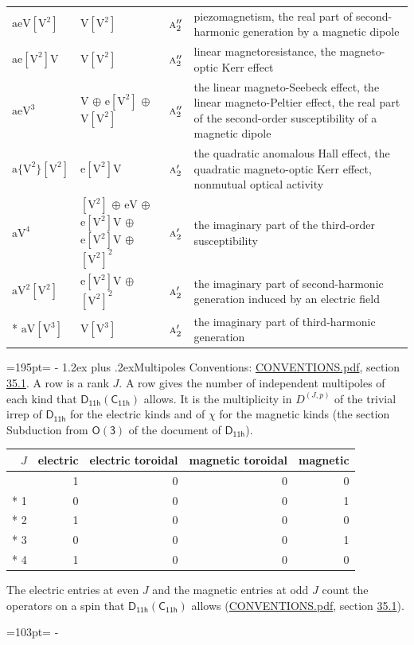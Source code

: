 \documentclass[10pt,a4paper]{article}
\makeatletter
\renewcommand\section{\@startsection{section}{1}{\z@}{-3ex plus -1ex minus -.2ex}%
  {1.2ex plus .2ex}{\normalfont\large\sffamily\bfseries\color{parttitle}}}
\newcommand{\needspace}[1]{\par\penalty-100\begingroup\dimen0=#1\relax\dimen2=\pagegoal
  \advance\dimen2-\pagetotal\ifdim\dimen0>\dimen2\relax\ifdim\dimen2>0pt\vfil\break\fi\fi
  \endgroup}
\numberwithin{equation}{section}
\newcommand{\grp}[1]{\mathsf{#1}}
\newcommand{\irr}[1]{\text{\normalfont\scshape #1}}
\newcommand{\irrJp}[2]{D^{(#1,#2)}}
\newcommand{\jahn}[1]{\mathrm{#1}}
\newlength{\fillwidth}\newlength{\cellwidth}\newlength{\colwidth}
\makeatother
\begin{document}
{\begin{longtable}{@{}lll>{\RaggedRight\arraybackslash}p{\fillwidth}@{}}
$\jahn{aeV[V^{2}]}$ & $\jahn{V[V^{2}]}$ & $\irr{a}_{2}''$ & piezomagnetism, the real part of second-harmonic generation by a magnetic dipole\\
$\jahn{ae[V^{2}]V}$ & $\jahn{V[V^{2}]}$ & $\irr{a}_{2}''$ & linear magnetoresistance, the magneto-optic Kerr effect\\
$\jahn{aeV^{3}}$ & $\jahn{V}$ $\oplus$ $\jahn{e[V^{2}]}$ $\oplus$ $\jahn{V[V^{2}]}$ & $\irr{a}_{2}''$ & the linear magneto-Seebeck effect, the linear magneto-Peltier effect, the real part of the second-order susceptibility of a magnetic dipole\\
$\jahn{a\{V^{2}\}[V^{2}]}$ & $\jahn{e[V^{2}]V}$ & $\irr{a}_{2}'$ & the quadratic anomalous Hall effect, the quadratic magneto-optic Kerr effect, nonmutual optical activity\\
$\jahn{aV^{4}}$ & $\jahn{[V^{2}]}$ $\oplus$ $\jahn{eV}$ $\oplus$ $\jahn{e[V^{2}]V}$ $\oplus$ $\jahn{e[V^{2}]V}$ $\oplus$ $\jahn{[V^{2}]^{2}}$ & $\irr{a}_{2}'$ & the imaginary part of the third-order susceptibility\\
$\jahn{aV^{2}[V^{2}]}$ & $\jahn{e[V^{2}]V}$ $\oplus$ $\jahn{[V^{2}]^{2}}$ & $\irr{a}_{2}'$ & the imaginary part of second-harmonic generation induced by an electric field\\*
$\jahn{aV[V^{3}]}$ & $\jahn{V[V^{3}]}$ & $\irr{a}_{2}'$ & the imaginary part of third-harmonic generation\\
\bottomrule\end{longtable}}
\needspace{195pt}
\section{Multipoles}\label{s:multipoles}
Conventions: \href{../../CONVENTIONS.pdf}{CONVENTIONS.pdf}, section \href{../../CONVENTIONS.pdf\#conv.35.1}{35.1}.
A row is a rank $J$. \label{n:head.multipole.electric}\label{n:head.multipole.electric.toroidal}\label{n:head.multipole.magnetic.toroidal}\label{n:head.multipole.magnetic}A row gives the number of independent multipoles of each kind that $\grp{D_{11h}}(\grp{C_{11h}})$ allows. It is the multiplicity in $\irrJp{J}{p}$ of the trivial irrep of $\grp{D_{11h}}$ for the electric kinds and of $\chi$ for the magnetic kinds (the section Subduction from $\grp{O(3)}$ of the document of \href{../../../rotation/data/pdf/D11h.pdf}{$\grp{D_{11h}}$}).
{\small\begin{longtable}{@{}rrrrr@{}}\toprule
$J$ & electric & electric toroidal & magnetic toroidal & magnetic\\\midrule\endhead
\bottomrule\endfoot\endlastfoot
0 & 1 & 0 & 0 & 0\\*
1 & 0 & 0 & 0 & 1\\*
2 & 1 & 0 & 0 & 0\\*
3 & 0 & 0 & 0 & 1\\*
4 & 1 & 0 & 0 & 0\\
\bottomrule\end{longtable}}
The electric entries at even $J$ and the magnetic entries at odd $J$ count the operators on a spin that $\grp{D_{11h}}(\grp{C_{11h}})$ allows (\href{../../CONVENTIONS.pdf}{CONVENTIONS.pdf}, section \href{../../CONVENTIONS.pdf\#conv.35.1}{35.1}).
\needspace{103pt}
\end{document}
